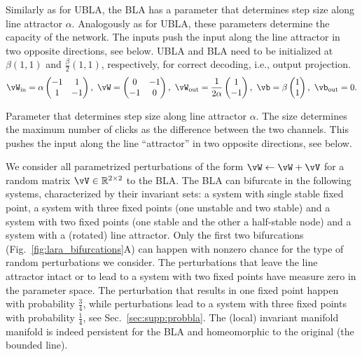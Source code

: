 \documentclass{article} %
\newcounter{ct}
\newcommand{\win}{\vW_{\text{in}}}
\newcommand{\wout}{\vW_{\text{out}}}
\newcommand{\bout}{\vb_{\text{out}}}
\theoremstyle{definition}
\theoremstyle{remark}
\begin{document}
Similarly as for UBLA, the BLA has a parameter that determines step size along line attractor \(\alpha\). Analogously as for UBLA, these parameters determine the capacity of the network.
The inputs push the input along the line attractor in two opposite directions, see below. UBLA and BLA need to be initialized at \(\beta(1,1)\) and \(\tfrac{\beta}{2}(1,1)\), respectively, for correct decoding, i.e., output projection.
\begin{equation}\label{eq:bla}
\win = \alpha
\begin{pmatrix}
-1  &  1 \\
1  &  -1
\end{pmatrix}, \
\vW =
\begin{pmatrix}
0  &  -1 \\
-1  &  0
\end{pmatrix}, \
\wout = \frac{1}{2\alpha}
\begin{pmatrix}
1  \\  -1
\end{pmatrix}, \
\vb = \beta
\begin{pmatrix}
1 \\  1
\end{pmatrix}, \
\bout = 0.
\end{equation}


Parameter that determines step size along line attractor \(\alpha\).
The size determines the maximum number of clicks as the difference between the two channels.
This pushes the input along the line ``attractor'' in two opposite directions, %
see below.


We consider all parametrized perturbations of the form \( \vW \leftarrow \vW + \vV\) for a random matrix \(\vV\in \mathbb{R}^{2\times 2}\) to the BLA.
The BLA can bifurcate in the following systems, characterized by their invariant sets: a system with single stable fixed point, a system with three fixed points (one unstable and two stable) and  a system with two fixed points (one stable and the other a half-stable node) and a system with a (rotated) line attractor.
Only the first two bifurcations (Fig.~\ref{fig:lara_bifurcations}A) can happen with nonzero chance for the type of random perturbations we consider.
The perturbations that leave the line attractor intact or to lead to a system with two fixed points have measure zero in the parameter space.
The perturbation that results in one fixed point happen with probability \(\frac{3}{4}\), while perturbations lead to a system with three fixed points with probability \(\frac{1}{4}\), see Sec.~\ref{sec:supp:probbla}.
The (local) %
 invariant manifold manifold is indeed persistent for the BLA and homeomorphic to the original (the bounded line).
\end{document}
